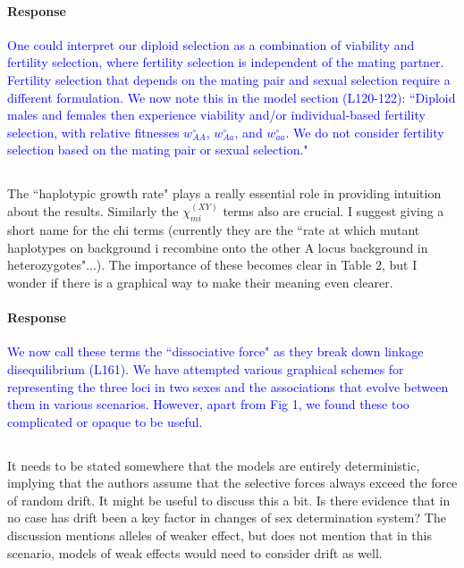 \documentclass[10pt,letterpaper]{article}
\begin{document}
\noindent\paragraph{Response}
\textcolor{blue}{
One could interpret our diploid selection as a combination of viability and fertility selection, where fertility selection is independent of the mating partner.
Fertility selection that depends on the mating pair and sexual selection require a different formulation.
We now note this in the model section (L120-122):
``Diploid males and females then experience viability and/or individual-based fertility selection, with relative fitnesses $w_{AA}^{\circ}$, $w_{Aa}^{\circ}$, and $w_{aa}^{\circ}$. 
We do not consider fertility selection based on the mating pair or sexual selection."
}

\noindent\subsection{}
The ``haplotypic growth rate" plays a really essential role in providing intuition about the results. Similarly the $\chi_{mi}^{(XY)}$ terms also are crucial.  I suggest giving a short name for the chi terms (currently they are the ``rate at which mutant haplotypes on background i recombine onto the other A locus background in heterozygotes"...).   The importance of these becomes clear in Table 2, but I wonder if there is a graphical way to make their meaning even clearer.  

\noindent\paragraph{Response}
\textcolor{blue}{
We now call these terms the ``dissociative force" as they break down linkage disequilibrium (L161). 
We have attempted various graphical schemes for representing the three loci in two sexes and the associations that evolve between them in various scenarios. 
However, apart from Fig 1, we found these too complicated or opaque to be useful. 
}

\noindent\subsection{}
It needs to be stated somewhere that the models are entirely deterministic, implying that the authors assume that the selective forces always exceed the force of random drift. It might be useful to discuss this a bit. Is there evidence that in no case has drift been a key factor in changes of sex determination system?  The discussion mentions alleles of weaker effect, but does not mention that in this scenario, models of weak effects would need to consider drift as well.
\end{document}

